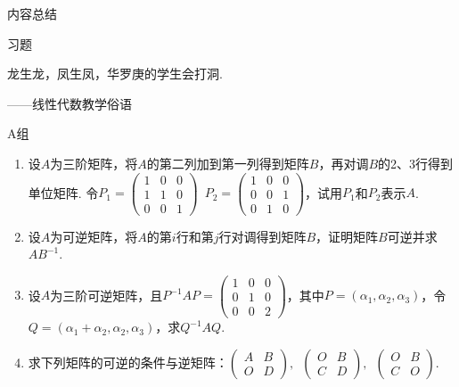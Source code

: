 \begin{solution}

\end{solution}

\vspace{2ex}
\centerline{\heiti \Large 内容总结}

\vspace{2ex}
\centerline{\heiti \Large 习题}

\vspace{2ex}
{\kaishu 龙生龙，凤生凤，华罗庚的学生会打洞.}
\begin{flushright}
    \kaishu
    ——线性代数教学俗语
\end{flushright}

\centerline{\heiti A组}
\begin{enumerate}
    \item 设$A$为三阶矩阵，将$A$的第二列加到第一列得到矩阵$B$，再对调$B$的2、3行得到单位矩阵. 令$P_1=\begin{pmatrix}1 & 0 & 0 \\ 1 & 1 & 0 \\ 0 & 0 & 1\end{pmatrix}\enspace
              P_2=\begin{pmatrix}1 & 0 & 0 \\ 0 & 0 & 1 \\ 0 & 1 & 0\end{pmatrix}$，试用$P_1$和$P_2$表示$A$.

    \item 设$A$为可逆矩阵，将$A$的第$i$行和第$j$行对调得到矩阵$B$，证明矩阵$B$可逆并求$AB^{-1}$.

    \item 设$A$为三阶可逆矩阵，且$P^{-1}AP=\begin{pmatrix}1 & 0 & 0 \\ 0 & 1 & 0 \\ 0 & 0 & 2\end{pmatrix}$，其中$P=(\alpha_1,\alpha_2,\alpha_3)$，令$Q=(\alpha_1+\alpha_2,\alpha_2,\alpha_3)$，求$Q^{-1}AQ$.

    \item 求下列矩阵的可逆的条件与逆矩阵：$\begin{pmatrix}
                  A & B \\ O & D
              \end{pmatrix},\enspace \begin{pmatrix}
                  O & B \\ C & D
              \end{pmatrix},\enspace \begin{pmatrix}
                  O & B \\ C & O
              \end{pmatrix}$.
\end{enumerate}

